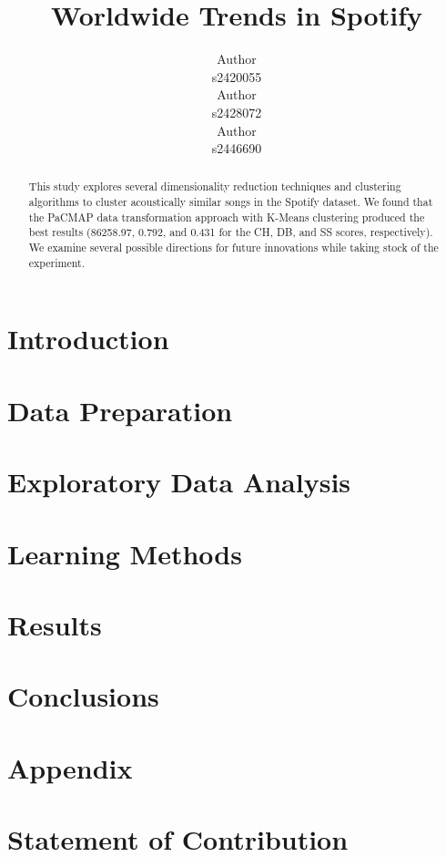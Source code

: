 \documentclass{article}
\title{Worldwide Trends in Spotify}
\author{
  Author\\
  s2420055\\
  \And
  Author\\
  s2428072\\
  \And
  Author\\
  s2446690\\
}
\begin{document}
\maketitle

\begin{abstract}
This study explores several dimensionality reduction techniques and clustering algorithms to cluster acoustically similar songs in the Spotify dataset. We found that the PaCMAP data transformation approach with K-Means clustering produced the best results (86258.97, 0.792, and 0.431 for the CH, DB, and SS scores, respectively). We examine several possible directions for future innovations while taking stock of the experiment.
\end{abstract}

\section{Introduction}

\section{Data Preparation}

\section{Exploratory Data Analysis}

\section{Learning Methods}

\section{Results}

\vspace{-2em}
\section{Conclusions}



\newpage
\section{Appendix}
 
\clearpage
\section*{Statement of Contribution}

\end{document}
